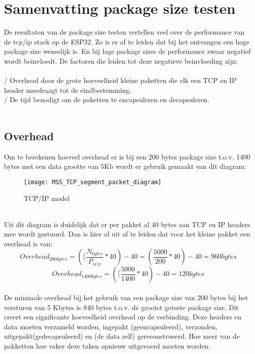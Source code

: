 \documentclass[../DCM2_Verslag.tex]{subfiles}
\begin{document}
\section{Samenvatting package size testen}
De resultaten van de package size testen vertellen veel over de performance van de tcp/ip stack op de ESP32. Zo is er af te leiden dat bij het ontvangen een hoge package size wenselijk is. En bij lage package sizes de performance zwaar negatief wordt beinvloedt. De factoren die leiden tot deze negatieve beinvloeding zijn:\\\\ \-/ Overhead door de grote hoeveelheid kleine paketten die elk een TCP en IP header meedraagt tot de eindbestemming.\\
\-/ De tijd benodigt om de paketten te encapsuleren en decapsuleren.
\\\\
\clearpage
\subsection{Overhead}
Om te berekenen hoeveel overhead er is bij een 200 bytes package size t.o.v. 1400 bytes met een data grootte van 5Kb wordt er gebruik gemaakt van dit diagram:\\
\begin{figure}[h]
\centering
\texttt{[image: MSS\_TCP\_segment\_packet\_diagram]}
\caption{TCP/IP model}
\end{figure}
\\
Uit dit diagram is duidelijk dat er per pakket al 40 bytes aan TCP en IP headers mee wordt gestuurd. Dan is hier al uit af te leiden dat voor het kleine pakket een overhead is van:
\[Overhead_{200bytes} = (\lceil{\frac{N_{bytes}}{P_{size}}} * 40)-40 =  (\frac{5000}{200}*40)-40= 960 bytes\]
\[Overhead_{1400bytes} = (\lceil{\frac{5000}{1400}}*40)-40= 120 bytes\]
\\
De minimale overhead bij het gebruik van een package size van 200 bytes bij het versturen van 5 Kbytes is 840 bytes t.o.v. de grootst geteste package size. Dit creert een significante hoeveelheid overhead op de verbinding. Deze headers en data moeten verzameld worden, ingepakt (geencapsuleerd), verzonden, uitgepakt(gedecapsuleerd) en (de data zelf) gereconstrueerd. Hoe meer van de pakketten hoe vaker deze taken opnieuw uitgevoerd moeten worden.
\clearpage
\end{document}
